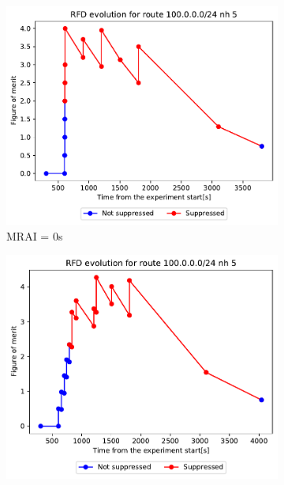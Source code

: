 \begin{figure}[h]
     \centering
     \begin{subfigure}[b]{0.3\textwidth}
         \centering
         \includegraphics[width=\textwidth]{images/RFD/clique/FigureOfMerit/mrai1_RFD_x_rfd_R1.pdf}
         \caption{MRAI = 0s}
         \label{fig:clique_x_mrai0}
     \end{subfigure}
     \hfill
     \begin{subfigure}[b]{0.3\textwidth}
         \centering
         \includegraphics[width=\textwidth]{images/RFD/clique/FigureOfMerit/mrai11_RFD_x_rfd_R1.pdf}

\end{subfigure}
\end{figure}
